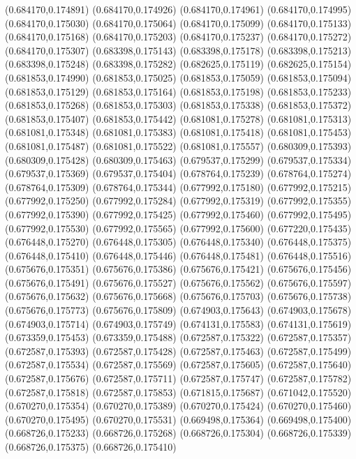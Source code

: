 (0.684170,0.174891)
(0.684170,0.174926)
(0.684170,0.174961)
(0.684170,0.174995)
(0.684170,0.175030)
(0.684170,0.175064)
(0.684170,0.175099)
(0.684170,0.175133)
(0.684170,0.175168)
(0.684170,0.175203)
(0.684170,0.175237)
(0.684170,0.175272)
(0.684170,0.175307)
(0.683398,0.175143)
(0.683398,0.175178)
(0.683398,0.175213)
(0.683398,0.175248)
(0.683398,0.175282)
(0.682625,0.175119)
(0.682625,0.175154)
(0.681853,0.174990)
(0.681853,0.175025)
(0.681853,0.175059)
(0.681853,0.175094)
(0.681853,0.175129)
(0.681853,0.175164)
(0.681853,0.175198)
(0.681853,0.175233)
(0.681853,0.175268)
(0.681853,0.175303)
(0.681853,0.175338)
(0.681853,0.175372)
(0.681853,0.175407)
(0.681853,0.175442)
(0.681081,0.175278)
(0.681081,0.175313)
(0.681081,0.175348)
(0.681081,0.175383)
(0.681081,0.175418)
(0.681081,0.175453)
(0.681081,0.175487)
(0.681081,0.175522)
(0.681081,0.175557)
(0.680309,0.175393)
(0.680309,0.175428)
(0.680309,0.175463)
(0.679537,0.175299)
(0.679537,0.175334)
(0.679537,0.175369)
(0.679537,0.175404)
(0.678764,0.175239)
(0.678764,0.175274)
(0.678764,0.175309)
(0.678764,0.175344)
(0.677992,0.175180)
(0.677992,0.175215)
(0.677992,0.175250)
(0.677992,0.175284)
(0.677992,0.175319)
(0.677992,0.175355)
(0.677992,0.175390)
(0.677992,0.175425)
(0.677992,0.175460)
(0.677992,0.175495)
(0.677992,0.175530)
(0.677992,0.175565)
(0.677992,0.175600)
(0.677220,0.175435)
(0.676448,0.175270)
(0.676448,0.175305)
(0.676448,0.175340)
(0.676448,0.175375)
(0.676448,0.175410)
(0.676448,0.175446)
(0.676448,0.175481)
(0.676448,0.175516)
(0.675676,0.175351)
(0.675676,0.175386)
(0.675676,0.175421)
(0.675676,0.175456)
(0.675676,0.175491)
(0.675676,0.175527)
(0.675676,0.175562)
(0.675676,0.175597)
(0.675676,0.175632)
(0.675676,0.175668)
(0.675676,0.175703)
(0.675676,0.175738)
(0.675676,0.175773)
(0.675676,0.175809)
(0.674903,0.175643)
(0.674903,0.175678)
(0.674903,0.175714)
(0.674903,0.175749)
(0.674131,0.175583)
(0.674131,0.175619)
(0.673359,0.175453)
(0.673359,0.175488)
(0.672587,0.175322)
(0.672587,0.175357)
(0.672587,0.175393)
(0.672587,0.175428)
(0.672587,0.175463)
(0.672587,0.175499)
(0.672587,0.175534)
(0.672587,0.175569)
(0.672587,0.175605)
(0.672587,0.175640)
(0.672587,0.175676)
(0.672587,0.175711)
(0.672587,0.175747)
(0.672587,0.175782)
(0.672587,0.175818)
(0.672587,0.175853)
(0.671815,0.175687)
(0.671042,0.175520)
(0.670270,0.175354)
(0.670270,0.175389)
(0.670270,0.175424)
(0.670270,0.175460)
(0.670270,0.175495)
(0.670270,0.175531)
(0.669498,0.175364)
(0.669498,0.175400)
(0.668726,0.175233)
(0.668726,0.175268)
(0.668726,0.175304)
(0.668726,0.175339)
(0.668726,0.175375)
(0.668726,0.175410)
